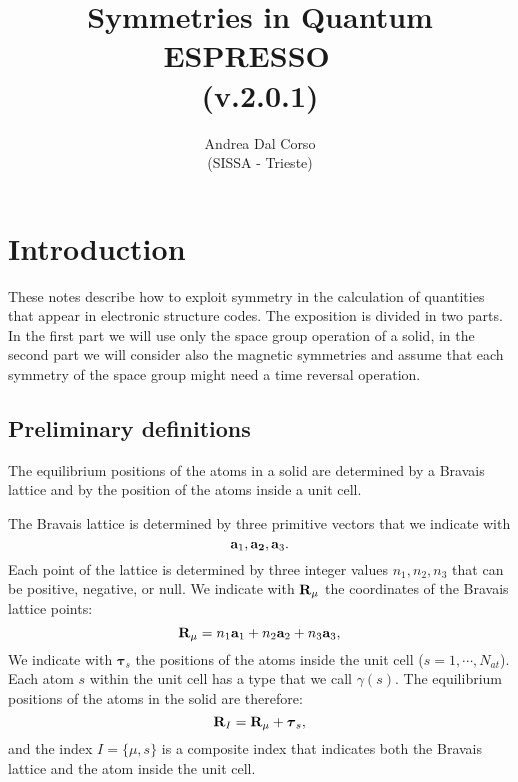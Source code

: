 \documentclass[12pt,a4paper,twoside]{report}
\def\version{2.0.1}
\begin{document}
\author{Andrea Dal Corso \\ (SISSA - Trieste)}
\date{}

\title{
  \vspace{3truecm}
  \Huge \color{dark-blue} Symmetries in Quantum ESPRESSO \ \\
   (v.\version)
}

\maketitle

\newpage

\tableofcontents

\newpage
\newpage
{\color{dark-blue}\chapter{Introduction}}
These notes describe how to exploit symmetry in the calculation of
quantities that appear in electronic structure codes. The exposition
is divided in two parts.
In the first part we will use only the space group operation of a
solid, in the second part we will consider also the magnetic symmetries
and assume that each symmetry of the space group might need a time reversal operation.

\section{Preliminary definitions}
The equilibrium positions of the atoms in a solid are determined by
a Bravais lattice and by the position of the atoms inside a unit cell.

The Bravais lattice is determined by three primitive vectors that
we indicate with
\begin{equation}
{\bf a}_1, {\bf a_2}, {\bf a}_3.
\end{equation}
Each point of the lattice is determined by three integer values
$n_1, n_2, n_3$ that can be positive, negative, or null.
We indicate with ${\bf R}_\mu$ the coordinates of the Bravais lattice
points:
\begin{equation}
{\bf R}_\mu = n_1 {\bf a}_1 + n_2 {\bf a}_2 + n_3 {\bf a}_3,
\end{equation}
We indicate with $\boldsymbol{\tau}_s$ the positions of the atoms
inside the unit cell ($s=1,\cdots, N_{at}$).
Each atom $s$ within the
unit cell has a type that we call $\gamma(s)$.
The equilibrium positions of the atoms in the solid are therefore:
\begin{equation}
{\bf R}_I = {\bf R}_\mu + \boldsymbol{\tau}_s,
\end{equation}
and the index $I=\{\mu,s\}$ is a composite index that indicates both the
Bravais lattice and the atom inside the unit cell.
\end{document}
